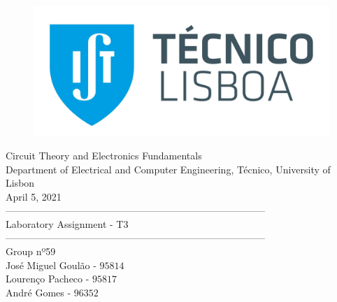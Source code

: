 
\thispagestyle {empty}


\begin{figure}[ht]
	\centering
	\includegraphics[width = 0.5\linewidth]{ist_foto}
\end{figure}


\begin{center}

	\vspace{2cm}
	{\FontLb Circuit Theory and Electronics Fundamentals} \\

	\vspace{0.5cm}
	{\FontSn Department of Electrical and Computer Engineering, Técnico, University of Lisbon} \\

	\vspace{0.5cm}
	{\FontSn April 5, 2021} \\

	\vspace{1cm}
	{\FontLb --------------------------------------------------------------------------------} \\
	\vspace{0.1cm}
	{\FontLb Laboratory Assignment - T3} \\
	{\FontLb --------------------------------------------------------------------------------} \\

	\vspace{1cm}
	{\FontMb Group nº59} \\
	\vspace{0.25cm}
	{\FontSn José Miguel Goulão - $95814$} \\
	{\FontSn Lourenço Pacheco - $95817$} \\
	{\FontSn André Gomes - $96352$} \\

	\vspace{.5cm}

\end{center}


